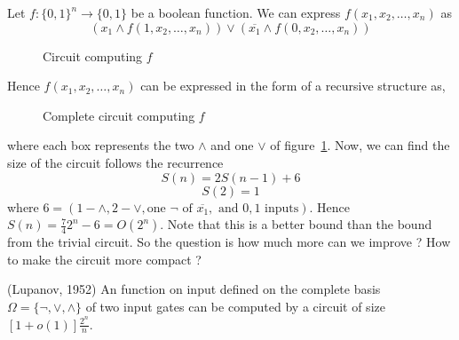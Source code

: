 Let $f:\{0,1\}^n \to \{0,1\}$ be a boolean function. We can express
$f(x_1,x_2,\ldots,x_n)$ as \[(x_1\land f(1,x_2,\ldots,x_n)) \lor 
(\overline{x_1}\land f(0,x_2,\ldots,x_n))\] 

\begin{figure}[htp!]
\centering

\caption{Circuit computing $f$}
\label{figure6}
\end{figure}
Hence $f(x_1,x_2,\ldots,x_n)$ can be expressed in the form of a recursive 
structure as, 
\begin{figure}[htp!]
\centering

\caption{Complete circuit computing $f$}
\label{figure7}
\end{figure}
where each box represents the two $\land$ and one $\lor$ of 
figure~\ref{figure6}. 
Now, we can find the size of the circuit follows the recurrence 
\[S(n) =2S(n-1) + 6\]\[ S(2) = 1 \] where $6 = (1 - \land, 2 - \lor, 
\text{one } \neg \text{ of } \overline{x_1}, 
\text{ and } 0,1 \text{ inputs})$. Hence $S(n) = \frac{7}{4}2^n - 6 = O(2^n)$.
Note that this is a better bound than the bound from the trivial circuit. 
So the question is how much more can we improve ? How to make the circuit more 
compact ?
\begin{theorem}(Lupanov, 1952) An function on input defined on the complete
basis $\Omega = \{ \neg, \lor, \land\}$ of two input gates can be computed by a
 circuit of size $[1+o(1)]\frac{2^n}{n}$.
\end{theorem}
